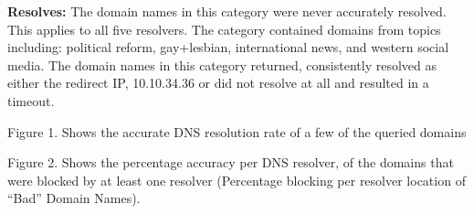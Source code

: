 \textbf{ Resolves:} The domain names in this category were never accurately resolved. This applies to all five resolvers. The category contained domains from topics including: political reform, gay+lesbian, international news, and western social media. The domain names in this category returned, consistently resolved as either the redirect IP, 10.10.34.36 or did not resolve at all and resulted in a timeout.

Figure 1. Shows the accurate DNS resolution rate of a few of the queried domains


Figure 2. Shows the percentage accuracy per DNS resolver, of the domains that were blocked by at least one resolver (Percentage blocking per resolver location of “Bad” Domain Names).
